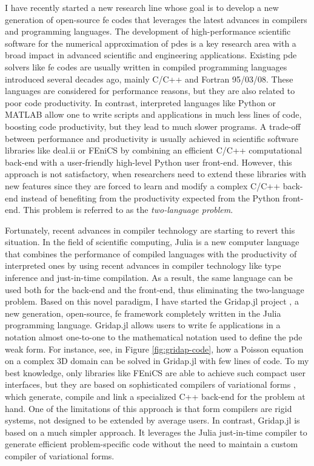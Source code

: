 \documentclass{article}
\begin{document}
I have recently started a new research line whose goal is to develop a new generation of open-source \ac{fe} codes that leverages the latest advances in compilers and programming languages.  The development of high-performance scientific software for the numerical approximation of \acp{pde} is a key research area with a broad impact in advanced scientific and engineering applications. Existing \ac{pde} solvers like \ac{fe} codes are usually written in compiled programming languages introduced several decades ago, mainly C/C++ and Fortran 95/03/08. These languages are considered for performance reasons, but they are also related to poor code productivity. In contrast, interpreted languages like Python or MATLAB allow one to write scripts and applications in much less lines of code, boosting code productivity, but they lead to much slower programs. A trade-off between performance and productivity is usually achieved in scientific software libraries like deal.ii \cite{Bangerth2007} or FEniCS \cite{Alnaes2015} by combining an efficient C/C++ computational back-end with a user-friendly high-level Python user front-end. However, this approach is not satisfactory, when researchers need to extend these libraries with new features since they are forced to learn and modify a complex C/C++ back-end instead of benefiting from the productivity expected from the Python front-end. This problem is referred to as the \emph{two-language problem}.

Fortunately, recent advances in compiler technology are starting to revert this situation. In the field of scientific computing, Julia \cite{Bezanson2017} is a new computer language that combines the performance of compiled languages with the productivity of interpreted ones by using recent advances in compiler technology like type inference and just-in-time compilation. As a result, the same language can be used both for the back-end and the front-end, thus eliminating the two-language problem. Based on this novel paradigm, I have started the Gridap.jl project \cite{Badia2020}, a new generation, open-source, \ac{fe} framework completely written in the Julia programming language. Gridap.jl allows users to write \ac{fe} applications in a notation almost one-to-one to the mathematical notation used to define the \ac{pde} weak form. For instance, see, in Figure \ref{fig:gridap-code}, how a Poisson equation on a complex 3D domain can be solved in Gridap.jl with few lines of code. To my best knowledge, only libraries like FEniCS are able to achieve such compact user interfaces, but they are based on sophisticated compilers of variational forms \cite{Kirby2006}, which generate, compile and link a specialized C++ back-end for the problem at hand. One of the limitations of this approach is that form compilers are rigid systems, not designed to be extended by average users. In contrast, Gridap.jl is based on a much simpler approach. It leverages the Julia just-in-time compiler to generate efficient problem-specific code without the need to maintain a custom compiler of variational forms.
\end{document}
